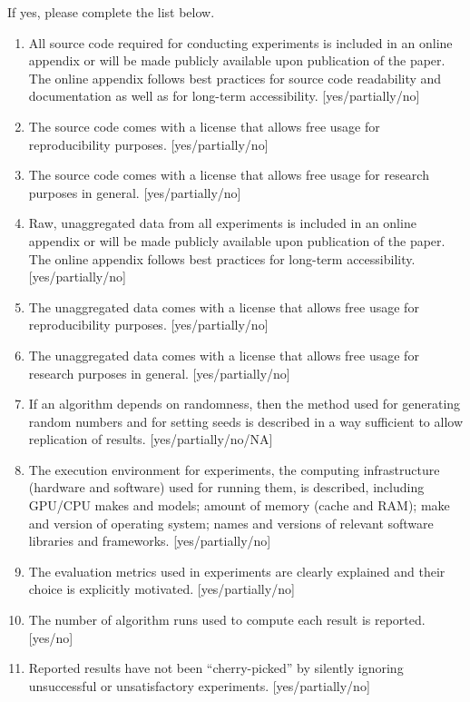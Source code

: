 If yes, please complete the list below.
\begin{enumerate}
    \item 
    All source code required for conducting experiments is included in an online appendix 
    or will be made publicly available upon publication of the paper.
    The online appendix follows best practices for source code readability and documentation as well as for long-term accessibility.
    [yes/partially/no]
    \item The source code comes with a license that
    allows free usage for reproducibility purposes.
    [yes/partially/no]
    \item The source code comes with a license that
    allows free usage for research purposes in general.
    [yes/partially/no]
    \item 
    Raw, unaggregated data from all experiments is included in an online appendix 
    or will be made publicly available upon publication of the paper.
    The online appendix follows best practices for long-term accessibility.
    [yes/partially/no]
    \item The unaggregated data comes with a license that
    allows free usage for reproducibility purposes.
    [yes/partially/no]
    \item The unaggregated data comes with a license that
    allows free usage for research purposes in general.
    [yes/partially/no]
    \item If an algorithm depends on randomness, then the method used for generating random numbers and for setting seeds is described in a way sufficient to allow replication of results. 
    [yes/partially/no/NA]
    \item The execution environment for experiments, the computing infrastructure (hardware and software) used for running them, is described, including GPU/CPU makes and models; amount of memory (cache and RAM); make and version of operating system; names and versions of relevant software libraries and frameworks. 
    [yes/partially/no]
    \item 
    The evaluation metrics used in experiments are clearly explained and their choice is explicitly motivated. 
    [yes/partially/no]
    \item 
    The number of algorithm runs used to compute each result is reported. 
    [yes/no]
    \item 
    Reported results have not been ``cherry-picked'' by silently ignoring unsuccessful or unsatisfactory experiments. 
    [yes/partially/no]

\end{enumerate}

